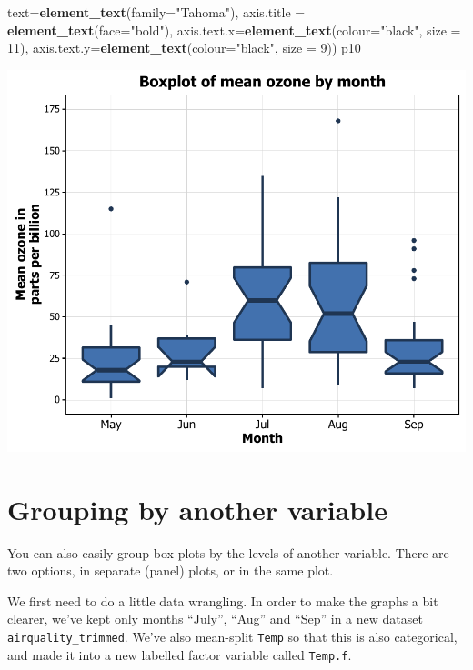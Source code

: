 \documentclass[]{article}
\newenvironment{Shaded}{\begin{snugshade}}{\end{snugshade}}
\newcommand{\KeywordTok}[1]{\textcolor[rgb]{0.13,0.29,0.53}{\textbf{{#1}}}}
\newcommand{\DataTypeTok}[1]{\textcolor[rgb]{0.13,0.29,0.53}{{#1}}}
\newcommand{\DecValTok}[1]{\textcolor[rgb]{0.00,0.00,0.81}{{#1}}}
\newcommand{\StringTok}[1]{\textcolor[rgb]{0.31,0.60,0.02}{{#1}}}
\newcommand{\NormalTok}[1]{{#1}}
\begin{document}
\begin{Shaded}
\begin{Highlighting}[]
    \DataTypeTok{text=}\KeywordTok{element_text}\NormalTok{(}\DataTypeTok{family=}\StringTok{"Tahoma"}\NormalTok{), }
    \DataTypeTok{axis.title =} \KeywordTok{element_text}\NormalTok{(}\DataTypeTok{face=}\StringTok{"bold"}\NormalTok{),}
    \DataTypeTok{axis.text.x=}\KeywordTok{element_text}\NormalTok{(}\DataTypeTok{colour=}\StringTok{"black"}\NormalTok{, }\DataTypeTok{size =} \DecValTok{11}\NormalTok{), }
    \DataTypeTok{axis.text.y=}\KeywordTok{element_text}\NormalTok{(}\DataTypeTok{colour=}\StringTok{"black"}\NormalTok{, }\DataTypeTok{size =} \DecValTok{9}\NormalTok{)) }
\NormalTok{p10}
\end{Highlighting}
\end{Shaded}

\begin{center}\includegraphics{10_Boxplots_pdf/box_16-1} \end{center}

\section{Grouping by another
variable}\label{grouping-by-another-variable}

You can also easily group box plots by the levels of another variable.
There are two options, in separate (panel) plots, or in the same plot.

We first need to do a little data wrangling. In order to make the graphs
a bit clearer, we've kept only months ``July'', ``Aug'' and ``Sep'' in a
new dataset \texttt{airquality\_trimmed}. We've also mean-split
\texttt{Temp} so that this is also categorical, and made it into a new
labelled factor variable called \texttt{Temp.f}.
\end{document}
